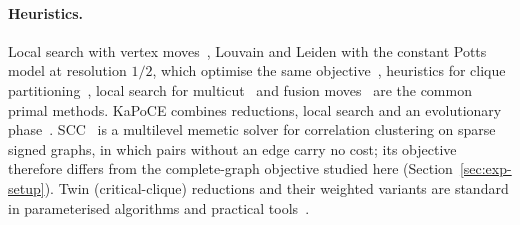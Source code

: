 \paragraph{Heuristics.}  Local search with vertex
moves~\cite{elsner2009bounding}, Louvain and Leiden with the constant Potts
model at resolution $1/2$, which optimise the same
objective~\cite{veldt2018lambdacc,BlondelGLL08,TraagWvE19}, heuristics for
clique partitioning~\cite{BruscoK09clique,ZhouHG16threephase,LuZH22hybrid},
local search for multicut~\cite{levinkov2017comparative} and fusion
moves~\cite{BeierHK15fusion} are the common primal methods.  KaPoCE combines
reductions, local search and an evolutionary
phase~\cite{BlasiusEtAl21kapoceHeur}.  SCC~\cite{hausberger2025scc} is a
multilevel memetic solver for correlation clustering on sparse signed graphs,
in which pairs without an edge carry no cost; its objective therefore differs
from the complete-graph objective studied here (Section~\ref{sec:exp-setup}).
Twin (critical-clique) reductions and their weighted variants are standard in
parameterised algorithms and practical tools~\cite{Guo09kernel,
ProttiDS09modular,BockerBBT09weighted,Bocker12golden,ChenM12kernel,
WittkopBLR07force,WittkopEtAl10transclust}.
